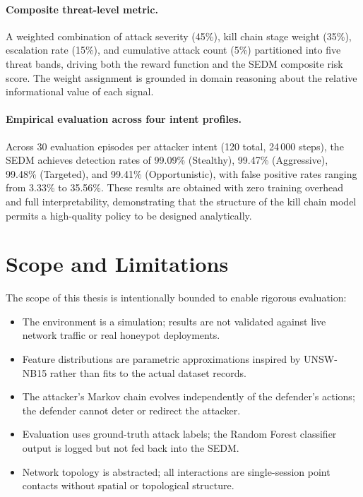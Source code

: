 \paragraph{Composite threat-level metric.}
A weighted combination of attack severity (45\%), kill chain stage weight
(35\%), escalation rate (15\%), and cumulative attack count (5\%) partitioned
into five threat bands, driving both the reward function and the SEDM
composite risk score.
The weight assignment is grounded in domain reasoning about the relative
informational value of each signal.

\paragraph{Empirical evaluation across four intent profiles.}
Across 30 evaluation episodes per attacker intent (120 total, 24\,000 steps),
the SEDM achieves detection rates of 99.09\% (Stealthy), 99.47\% (Aggressive),
99.48\% (Targeted), and 99.41\% (Opportunistic), with false positive rates
ranging from 3.33\% to 35.56\%.
These results are obtained with zero training overhead and full interpretability,
demonstrating that the structure of the kill chain model permits a high-quality
policy to be designed analytically.

\section{Scope and Limitations}

The scope of this thesis is intentionally bounded to enable rigorous evaluation:

\begin{itemize}
  \item The environment is a simulation; results are not validated against
        live network traffic or real honeypot deployments.
  \item Feature distributions are parametric approximations inspired by
        UNSW-NB15 rather than fits to the actual dataset records.
  \item The attacker's Markov chain evolves independently of the defender's
        actions; the defender cannot deter or redirect the attacker.
  \item Evaluation uses ground-truth attack labels; the Random Forest
        classifier output is logged but not fed back into the SEDM.
  \item Network topology is abstracted; all interactions are single-session
        point contacts without spatial or topological structure.
\end{itemize}

